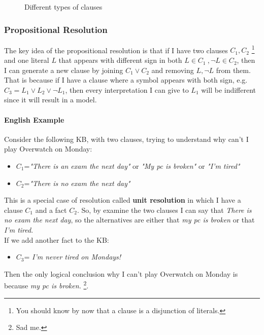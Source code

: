 \documentclass[10pt,a4paper]{article}
\begin{document}
\begin{figure}[H]
\centering
{}
\caption{Different types of clauses}
\label{fig:clauses}
\end{figure}

\subsubsection{Propositional Resolution }
\label{subsubsec:prop_resolution}
The key idea of the propositional resolution is that if I have two clauses $C_1,C_2$ \footnote{You should know by now that a clause is a disjunction of literals.} and one literal $L$ that appears with different sign in both $L \in C_1\ ,\neg L \in C_2$, then I can generate a new clause by joining $C_1 \vee C_2$ and removing $L,\neg L$ from them. That is because if I have a clause where a symbol appears with both sign, e.g. $C_3=L_1 \vee L_2 \vee \neg L_1$, then every interpretation I can give to $L_1$ will be indifferent since it will result in a model. 

\paragraph{English Example} Consider the following KB, with two clauses, trying to understand why can't I play Overwatch on Monday:
\begin{itemize}
\item $C_1$=\textit{"There is an exam the next day"} or \textit{"My pc is broken"} or \textit{"I'm tired"}
\item $C_2$=\textit{"There is no exam the next day"}
\end{itemize}
This is a special case of resolution called \textbf{unit resolution} in which I have a clause $C_1$ and a fact $C_2$. So, by examine the two clauses I can say that \textit{There is no exam the next day}, so the alternatives are either that \textit{my pc is broken} or that \textit{I'm tired}.\\
If we add another fact to the KB:
\begin{itemize}
\item $C_3$= \textit{I'm never tired on Mondays!}
\end{itemize}
Then the only logical conclusion why I can't play Overwatch on Monday is because \textit{my pc is broken.} \footnote{Sad me.}.
\end{document}
